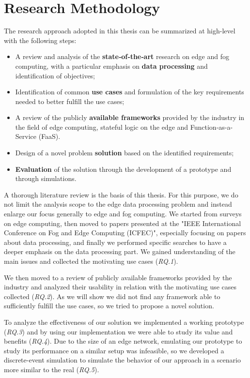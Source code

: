 \section{Research Methodology}
The research approach adopted in this thesis can be summarized at high-level with the following steps:
\begin{itemize}
    \item A review and analysis of the \textbf{state‐of‐the‐art} research on edge and fog computing, with a particular emphasis on \textbf{data processing} and identification of objectives;
    
    \item Identification of common \textbf{use cases} and formulation of the key requirements needed to better fulfill the use cases;
    
    \item A review of the publicly \textbf{available frameworks} provided by the industry in the field of edge computing, stateful logic on the edge and Function-as-a-Service (FaaS). 
    
    \item Design of a novel problem \textbf{solution} based on the identified requirements;
    
    \item \textbf{Evaluation} of the solution through the development of a prototype and through simulations.
\end{itemize}
A thorough literature review is the basis of this thesis. For this purpose, we do not limit the analysis scope to the edge data processing problem and instead enlarge our focus generally to edge and fog computing. We started from surveys on edge computing, then moved to papers presented at the "IEEE International Conference on Fog and Edge Computing (ICFEC)", especially focusing on papers about data processing, and finally we performed specific searches to have a deeper emphasis on the data processing part.
We gained understanding of the main issues and collected the motivating use cases (\textit{RQ.1}).

We then moved to a review of publicly available frameworks provided by the industry and analyzed their usability in relation with the motivating use cases collected (\textit{RQ.2}). As we will show we did not find any framework able to sufficiently fulfill the use cases, so we tried to propose a novel solution.

To analyze the effectiveness of our solution we implemented a working prototype (\textit{RQ.3}) and by using our implementation we were able to study its value and benefits (\textit{RQ.4}). Due to the size of an edge network, emulating our prototype to study its performance on a similar setup was infeasible, so we developed a discrete-event simulation to simulate the behavior of our approach in a scenario more similar to the real (\textit{RQ.5}).

